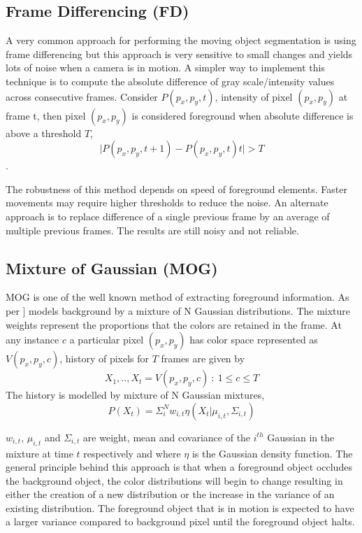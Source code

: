 \subsection{Frame Differencing (FD)}
A very common approach for performing the moving object segmentation is using frame differencing but this approach is very sensitive to small changes and yields lots of noise when a camera is in motion.  A simpler way to implement this technique is to compute the absolute difference of gray scale/intensity values across consecutive frames. Consider $P(p_x,p_y,t)$, intensity of pixel $(p_x,p_y)$ at frame t, then pixel $(p_x,p_y)$ is considered foreground when absolute difference is above a threshold $T$,$$\vert P(p_x,p_y,t+1) - P(p_x,p_y,t)t\vert > T$$.
\par The robustness of this method depends on speed of foreground elements.  Faster movements may require higher thresholds to reduce the noise.   An alternate approach is to replace difference of a single previous frame  by an average of multiple previous frames. The results are still noisy and not reliable.

\subsection{Mixture of Gaussian (MOG)}
MOG is one of the well known method of extracting foreground information.  As per \cite{kaew}] models background by a mixture of N Gaussian distributions.  The mixture weights represent the proportions that the colors are retained in the frame.  At any instance $c$ a particular pixel $(p_x,p_y)$ has color space represented as $V(p_{x},p_{y},c)$,  history of pixels for $T$ frames are given by 
$$X_{1},..,X_{t} = {V(p_{x},p_{y},c)~:~1\le c \le T }$$
The history is modelled by mixture of N Gaussian mixtures,
$$P(X_{t})=\Sigma_{i}^{N}w_{i,t}\eta(X_{t}|\mu_{i,t},\Sigma_{i,t})$$
\par $w_{i,t}$, $\mu_{i,t}$ and $\Sigma_{i,t}$ are weight, mean and covariance of the $i^{th}$ Gaussian in the mixture at time $t$ respectively and where $\eta$ is the Gaussian density function.  The general principle behind this approach is that when a foreground object occludes the background object, the color distributions will begin to change resulting in either the creation of a new distribution or the increase in the variance of an existing distribution.  The foreground object that is in motion is expected to have a larger variance compared to background pixel until the foreground object halts.


